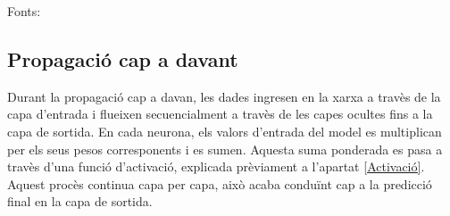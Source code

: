 Fonts: \cite{IMB_Xarxa_neuronal}

\subsection{Propagació cap a davant}\label{subsec:propagació}
Durant la propagació cap a davan, les dades ingresen en la xarxa a travès de la capa d'entrada i flueixen secuencialment a travès de les capes ocultes fins a la capa de sortida. En cada neurona, els valors d'entrada del model es multiplican per els seus pesos corresponents i es sumen. Aquesta suma ponderada es pasa a travès d'una funció d'activació, explicada prèviament a l'apartat \ref{Activació}. Aquest procès continua capa per capa, això acaba conduïnt cap a la predicció final en la capa de sortida.

